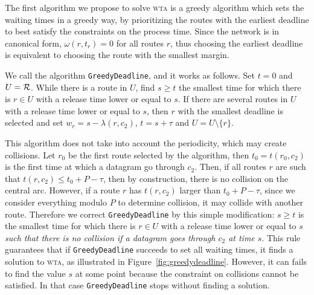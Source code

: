 \documentclass[a4paper,10pt]{journal}
\newcommand\greedydeadline{\texttt{GreedyDeadline}\xspace}
\newcommand\wta{\textsc{wta}\xspace}
\begin{document}
    The first algorithm we propose to solve \wta is a greedy algorithm which sets the waiting times in a greedy way, by prioritizing the routes with the earliest deadline to best satisfy the constraints on the process time. Since the network is in canonical form,
    $\omega(r,t_r) = 0$ for all routes $r$, thus choosing the earliest deadline is equivalent to choosing the route with the smallest margin.
    
    We call the algorithm \greedydeadline, and it works as follows. Set $t=0$ and $U = \cal{R}$. While there is a route in $U$, find $s \geq t$ the smallest time for which there is $r \in U$ with a release time lower or equal to $s$. If there are several routes in $U$ with a release time lower or equal  to $s$, then $r$ with the smallest deadline is selected and set $w_r = s - \lambda(r,c_2)$, $t = s + \tau$ and $ U = U \setminus \{r\}$.

    This algorithm does not take into account the periodicity, which may create collisions. Let $r_0$ be the first route selected by the algorithm, then $t_0 = t(r_0,c_2)$ is the first time at which a datagram go through $c_2$.
	Then, if all routes $r$ are such that $t(r, c_2) \leq t_0 + P - \tau$, 
	then by construction, there is no collision on the central arc.
      However, if a route $r$ has $t(r, c_2)$ larger than $t_0 + P - \tau$, since we consider everything modulo $P$ to determine collision, it may collide with another route. Therefore we correct \greedydeadline by this simple modification: $s \geq t$ is the smallest time for which there is $r \in U$ with a release time lower or equal to $s$ \emph{such that there is no collision if a datagram goes through $c_2$ at time $s$}. This rule guarantees that if \greedydeadline succeeds to set all waiting times, it finds a solution to \wta, as illustrated in Figure~\ref{fig:greedydeadline}. However, it can fails to find the value $s$ at some point because the constraint on collisions cannot be satisfied. In that case \greedydeadline stops without finding a solution.
    
\end{document}
